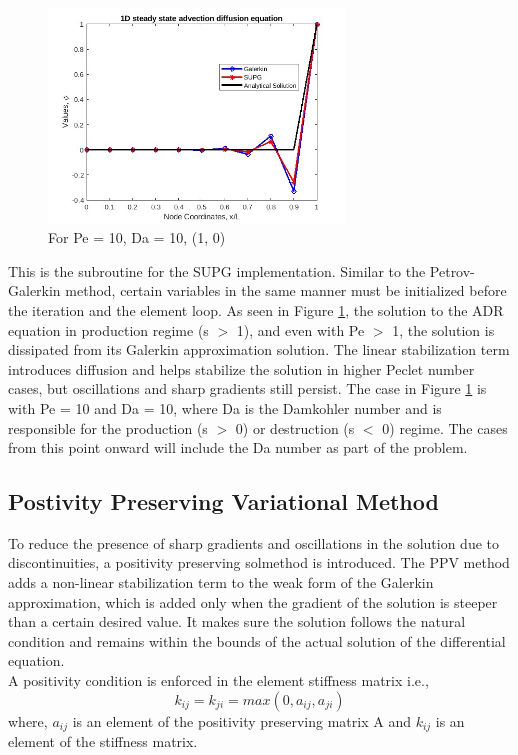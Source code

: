 \documentclass[12pt, oneside]{article}
\begin{document}
\begin{figure}[!h]
\centering
 \includegraphics[width=0.7\textwidth]{pe_10_da_10_supg_1_0.jpg}
 \caption{For Pe = 10, Da = 10, (1, 0)}
 \label{pe_10_da_10_1_0_supg}
\end{figure}
This is the subroutine for the SUPG implementation. Similar to the Petrov-Galerkin method, certain variables in the same manner must be initialized before the iteration and the element loop. As seen in Figure \ref{pe_10_da_10_1_0_supg}, the solution to the ADR equation in production regime (s $>$ 1), and even with Pe $>$ 1, the solution is dissipated from its Galerkin approximation solution. The linear stabilization term introduces diffusion and helps stabilize the solution in higher Peclet number cases, but oscillations and sharp gradients still persist. The case in Figure \ref{pe_10_da_10_1_0_supg} is with Pe = 10 and Da = 10, where Da is the Damkohler number and is responsible for the production (s $>$ 0) or destruction (s $<$ 0) regime. The cases from this point onward will include the Da number as part of the problem.
\subsection{Postivity Preserving Variational Method}
To reduce the presence of sharp gradients and oscillations in the solution due to discontinuities, a positivity preserving solmethod is introduced. The PPV method adds a non-linear stabilization term to the weak form of the Galerkin approximation, which is added only when the gradient of the solution is steeper than a certain desired value. It makes sure the solution follows the natural condition and remains within the bounds of the actual solution of the differential equation. \\
A positivity condition is enforced in the element stiffness matrix i.e.,
   \begin{equation}
       k_{ij} = k_{ji} = max(0, a_{ij}, a_{ji})
 \end{equation}
 where, $a_{ij}$ is an element of the positivity preserving matrix A and $k_{ij}$ is an element of the stiffness matrix.
\end{document}
